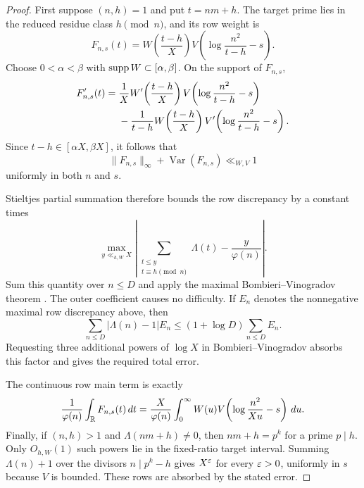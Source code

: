 \begin{proof}
First suppose $(n,h)=1$ and put $t=nm+h$.  The target prime lies in the
reduced residue class $h\pmod n$, and its row weight is
\begin{equation}\label{eq:Type-I-row-weight}
 F_{n,s}(t)
 =W\!\left(\frac{t-h}{X}\right)
 V\!\left(\log\frac{n^2}{t-h}-s\right).
\end{equation}
Choose $0<\alpha<\beta$ with $\operatorname{supp} W\subset[\alpha,\beta]$.  On the
support of $F_{n,s}$,
\begin{align}
 F_{n,s}'(t)
 ={}&\frac1XW'\!\left(\frac{t-h}{X}\right)
 V\!\left(\log\frac{n^2}{t-h}-s\right)
 \notag\\
 &-\frac1{t-h}W\!\left(\frac{t-h}{X}\right)
 V'\!\left(\log\frac{n^2}{t-h}-s\right).
 \label{eq:Type-I-row-derivative}
\end{align}
Since $t-h\in[\alpha X,\beta X]$, it follows that
\begin{equation}\label{eq:Type-I-uniform-variation}
 \|F_{n,s}\|_\infty+\operatorname{Var}(F_{n,s})
 \ll_{W,V}1
\end{equation}
uniformly in both $n$ and $s$.

Stieltjes partial summation therefore bounds the row discrepancy by a
constant times
\[
 \max_{y\ll_{h,W}X}
 \left|
  \sum_{\substack{t\leq y\\t\equiv h\pmod n}}\Lambda(t)
  -\frac{y}{\varphi(n)}
 \right|.
\]
Sum this quantity over $n\leq D$ and apply the maximal
Bombieri--Vinogradov theorem
\citep{Bombieri1965,Vinogradov1965,IwaniecKowalski2004}.  The outer
coefficient causes no difficulty.  If $E_n$ denotes the nonnegative
maximal row discrepancy above, then
\[
 \sum_{n\leq D}|\Lambda(n)-1|E_n
 \leq(1+\log D)\sum_{n\leq D}E_n.
\]
Requesting three additional powers of $\log X$ in
Bombieri--Vinogradov absorbs this factor and gives the required total
error.

The continuous row main term is exactly
\begin{align*}
 \frac1{\varphi(n)}\int_\mathbb R F_{n,s}(t)\,dt
 =\frac{X}{\varphi(n)}\int_0^\infty
 W(u)V\!\left(\log\frac{n^2}{Xu}-s\right)\,du.
\end{align*}
Finally, if $(n,h)>1$ and $\Lambda(nm+h)\ne0$, then
$nm+h=p^k$ for a prime $p\mid h$.  Only $O_{h,W}(1)$ such powers lie in
the fixed-ratio target interval.  Summing $\Lambda(n)+1$ over the divisors
$n\mid p^k-h$ gives $X^\varepsilon$ for every $\varepsilon>0$, uniformly in $s$ because
$V$ is bounded.  These rows are absorbed by the stated error.
\end{proof}


